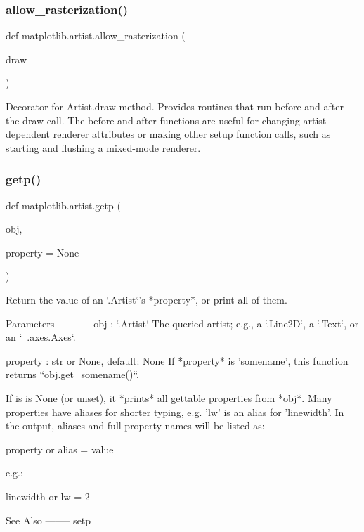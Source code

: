 \subsubsection{\texorpdfstring{allow\+\_\+rasterization()}{allow\_rasterization()}}
{\footnotesize\ttfamily def matplotlib.\+artist.\+allow\+\_\+rasterization (\begin{DoxyParamCaption}\item[{}]{draw }\end{DoxyParamCaption})}

\begin{DoxyVerb}Decorator for Artist.draw method. Provides routines
that run before and after the draw call. The before and after functions
are useful for changing artist-dependent renderer attributes or making
other setup function calls, such as starting and flushing a mixed-mode
renderer.
\end{DoxyVerb}
 \mbox{\label{namespacematplotlib_1_1artist_a785d2dbc5e400ed2895a0402aa5a033b}} 
\subsubsection{\texorpdfstring{getp()}{getp()}}
{\footnotesize\ttfamily def matplotlib.\+artist.\+getp (\begin{DoxyParamCaption}\item[{}]{obj,  }\item[{}]{property = {\ttfamily None} }\end{DoxyParamCaption})}

\begin{DoxyVerb}Return the value of an `.Artist`'s *property*, or print all of them.

Parameters
----------
obj : `.Artist`
    The queried artist; e.g., a `.Line2D`, a `.Text`, or an `~.axes.Axes`.

property : str or None, default: None
    If *property* is 'somename', this function returns
    ``obj.get_somename()``.

    If is is None (or unset), it *prints* all gettable properties from
    *obj*.  Many properties have aliases for shorter typing, e.g. 'lw' is
    an alias for 'linewidth'.  In the output, aliases and full property
    names will be listed as:

      property or alias = value

    e.g.:

      linewidth or lw = 2

See Also
--------
setp
\end{DoxyVerb}
 \mbox{\label{namespacematplotlib_1_1artist_a77bfe0d444aada684df5406441f82753}} 
